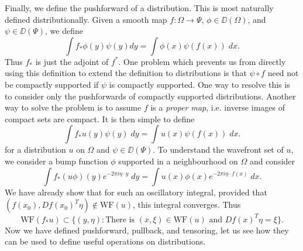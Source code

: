 Finally, we define the pushforward of a distribution. This is most naturally defined distributionally. Given a smooth map $f: \Omega \to \Psi$, $\phi \in \DD(\Omega)$, and $\psi \in \DD(\Psi)$, we define
%
\[ \int f_* \phi(y) \psi(y) dy = \int \phi(x) \psi(f(x))\; dx. \]
%
Thus $f_*$ is just the adjoint of $f^*$. One problem which prevents us from directly using this definition to extend the definition to distributions is that $\psi \circ f$ need not be compactly supported if $\psi$ is compactly supported. One way to resolve this is to consider only the pushforwards of compactly supported distributions. Another way to solve the problem is to assume $f$ is a \emph{proper map}, i.e. inverse images of compact sets are compact. It is then simple to define
%
\[ \int f_* u(y) \psi(y)\; dy = \int u(x) \psi(f(x))\; dx. \]
%
for a distribution $u$ on $\Omega$ and $\psi \in \DD(\Psi)$. To understand the wavefront set of $u$, we consider a bump function $\phi$ supported in a neighbourhood  on $\Omega$ and consider
%
\[ \int f_*(u \phi)(y) e^{-2 \pi i \eta \cdot y}\; dy = \int u(x) \phi(x) e^{-2 \pi i \eta \cdot f(x)}\; dx. \]
%
We have already show that for such an oscillatory integral, provided that $(f(x_0),Df(x_0)^T \eta) \not \in \text{WF}(u)$, this integral converges. Thus
%
\[ \text{WF}(f_* u) \subset \{ (y,\eta) : \text{There is $(x,\xi) \in \text{WF}(u)$ and $Df(x)^T \eta = \xi$} \}. \]
%
Now we have defined pushforward, pullback, and tensoring, let us see how they can be used to define useful operations on distributions.

